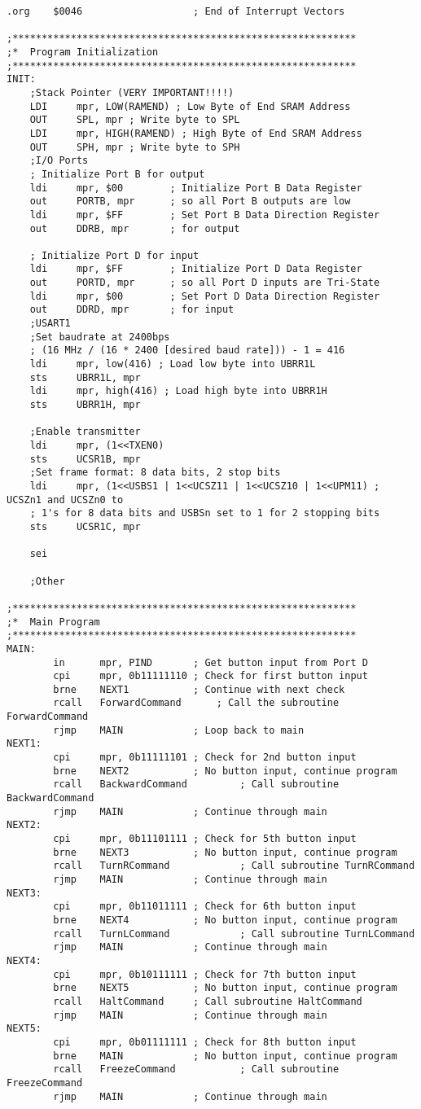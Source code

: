\documentclass[12pt,letterpaper]{article}
\begin{document}
{\begin{verbatim}
.org	$0046					; End of Interrupt Vectors

;***********************************************************
;*	Program Initialization
;***********************************************************
INIT:
	;Stack Pointer (VERY IMPORTANT!!!!)
	LDI 	mpr, LOW(RAMEND) ; Low Byte of End SRAM Address
	OUT 	SPL, mpr ; Write byte to SPL
	LDI 	mpr, HIGH(RAMEND) ; High Byte of End SRAM Address
	OUT 	SPH, mpr ; Write byte to SPH
	;I/O Ports
	; Initialize Port B for output
	ldi		mpr, $00		; Initialize Port B Data Register
	out		PORTB, mpr		; so all Port B outputs are low	
	ldi		mpr, $FF		; Set Port B Data Direction Register
	out		DDRB, mpr		; for output
	
	; Initialize Port D for input
	ldi		mpr, $FF		; Initialize Port D Data Register
	out		PORTD, mpr		; so all Port D inputs are Tri-State
	ldi		mpr, $00		; Set Port D Data Direction Register
	out		DDRD, mpr		; for input
	;USART1
	;Set baudrate at 2400bps
	; (16 MHz / (16 * 2400 [desired baud rate])) - 1 = 416
	ldi 	mpr, low(416) ; Load low byte into UBRR1L
	sts 	UBRR1L, mpr 
	ldi 	mpr, high(416) ; Load high byte into UBRR1H
	sts 	UBRR1H, mpr

	;Enable transmitter
	ldi		mpr, (1<<TXEN0)
	sts		UCSR1B, mpr
	;Set frame format: 8 data bits, 2 stop bits
	ldi		mpr, (1<<USBS1 | 1<<UCSZ11 | 1<<UCSZ10 | 1<<UPM11) ; UCSZn1 and UCSZn0 to 
	; 1's for 8 data bits and USBSn set to 1 for 2 stopping bits
	sts 	UCSR1C, mpr

	sei

	;Other

;***********************************************************
;*	Main Program
;***********************************************************
MAIN:
		in		mpr, PIND		; Get button input from Port D
		cpi		mpr, 0b11111110	; Check for first button input
		brne	NEXT1			; Continue with next check
		rcall	ForwardCommand		; Call the subroutine ForwardCommand
		rjmp	MAIN			; Loop back to main
NEXT1:	
		cpi		mpr, 0b11111101	; Check for 2nd button input 
		brne	NEXT2			; No button input, continue program
		rcall	BackwardCommand			; Call subroutine BackwardCommand
		rjmp	MAIN			; Continue through main
NEXT2:	
		cpi		mpr, 0b11101111	; Check for 5th button input 
		brne	NEXT3			; No button input, continue program
		rcall	TurnRCommand			; Call subroutine TurnRCommand
		rjmp	MAIN			; Continue through main
NEXT3:	
		cpi		mpr, 0b11011111	; Check for 6th button input 
		brne	NEXT4			; No button input, continue program
		rcall	TurnLCommand			; Call subroutine TurnLCommand
		rjmp	MAIN			; Continue through main
NEXT4:	
		cpi		mpr, 0b10111111	; Check for 7th button input 
		brne	NEXT5			; No button input, continue program
		rcall	HaltCommand		; Call subroutine HaltCommand
		rjmp	MAIN			; Continue through main
NEXT5:	
		cpi		mpr, 0b01111111	; Check for 8th button input 
		brne	MAIN			; No button input, continue program
		rcall	FreezeCommand			; Call subroutine FreezeCommand
		rjmp	MAIN			; Continue through main


\end{verbatim}}
\end{document}
